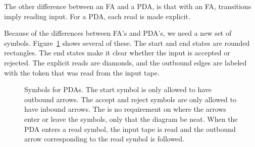 \documentclass[letterpaper,12pt,openany,reqno]{book}%
\newcommand{\pdaterminal}[3] {\node at (#1) (#2) [rectangle, draw, rounded corners] {#3};}
\newcommand{\pdaread}[3] {\node at (#1) (#2) [diamond, draw] {#3}; }
\newcommand{\pdatransition}[3] {\draw [->] (#1) -- (#2) node [midway, above] {#3};}
\newcommand{\pdarighttransition}[3] {\draw [->] (#1) -- (#2) node [midway, right] {#3};}
\begin{document}
The other difference between an FA and a PDA, is that with an FA, transitions imply reading input. For a PDA, each read is made explicit.

Because of the differences between FA's and PDA's, we need a new set of symbols. Figure~\ref{F.pda.symbols} shows several of these. The start and end states are rounded rectangles. The end states make it clear whether the input is accepted or rejected. The explicit reads are diamonds, and the outbound edges are labeled with the token that was read from the input tape.

\begin{figure}[htbp]
\centering
{}

\caption[Symbols for PDAs]{Symbols for PDAs. The start symbol is only allowed to have outbound arrows. The accept and reject symbols are only allowed to have inbound arrows. The is no requirement on where the arrows enter or leave the symbols, only that the diagram be neat. When the PDA enters a read symbol, the input tape is read and the outbound arrow corresponding to the read symbol is followed.}
\label{F.pda.symbols}
\end{figure}
\end{document}
